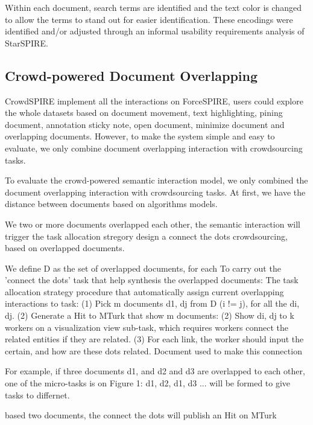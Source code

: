 \documentclass[journal]{vgtc}                %
\begin{document}
Within each document, search terms are identified and the text color is changed to allow the terms to stand out for easier identification.
These encodings were identified and/or adjusted through an informal usability requirements analysis of StarSPIRE.

\subsection{Crowd-powered Document Overlapping}
CrowdSPIRE implement all the interactions on ForceSPIRE, users could explore the whole datasets based on document movement, text highlighting, pining document, annotation sticky note, open document, minimize document and overlapping documents. However, to make the system simple and easy to evaluate, we only combine document overlapping interaction with crowdsourcing tasks.

To evaluate the crowd-powered semantic interaction model, we only combined the document overlapping interaction with crowdsourcing tasks.
At first, we have the distance between documents based on algorithms models.

We two or more documents overlapped each other, the semantic interaction will trigger the task allocation stregory design a connect the dots crowdsourcing, based on overlapped documents.

We define D as the set of overlapped documents, for each
To carry out the 'connect the dots' task that help synthesis the overlapped documents:
The task allocation strategy procedure that automatically assign current overlapping interactions to task:\newline
(1) Pick m documents d1, dj from D (i != j), for all the di, dj. \newline
(2) Generate a Hit to MTurk that show m documents:
(2)	Show di, dj to k workers on a visualization view sub-task, which requires workers connect the related entities if they are related. \newline
(3) For each link, the worker should input the certain, and how are these dots related. Document used to make this connection \newline

For example, if three documents d1, and d2 and d3 are overlapped to each other, one of the micro-tasks is on Figure 1: {d1, d2}, {d1, d3} ... will be formed to give tasks to differnet.

based two documents, the connect the dots will publish an Hit on MTurk
\end{document}
